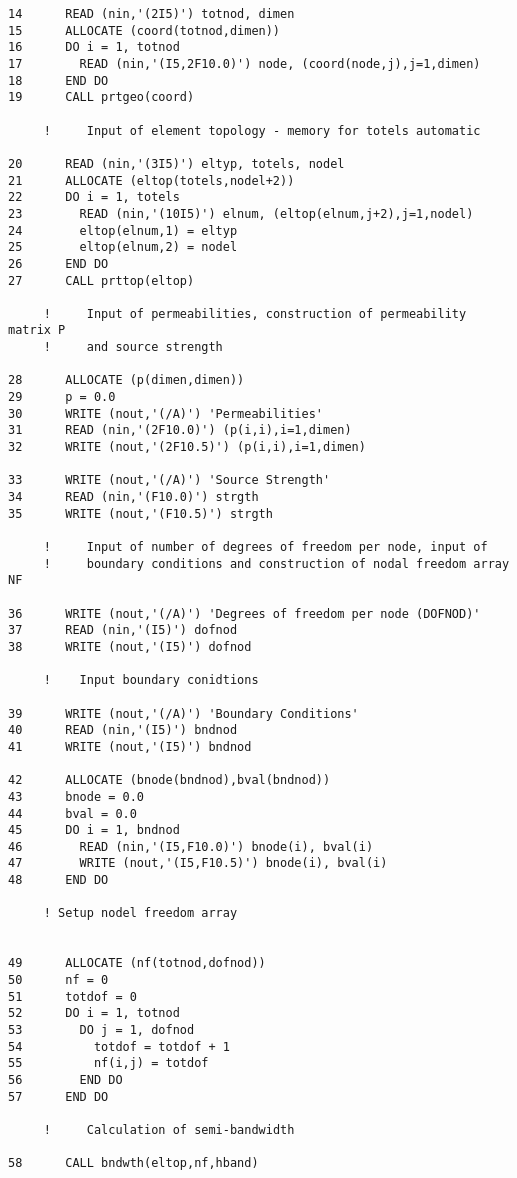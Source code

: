 \begin{verbatim}
14      READ (nin,'(2I5)') totnod, dimen
15      ALLOCATE (coord(totnod,dimen))
16      DO i = 1, totnod
17        READ (nin,'(I5,2F10.0)') node, (coord(node,j),j=1,dimen)
18      END DO
19      CALL prtgeo(coord)
     
     !     Input of element topology - memory for totels automatic
     
20      READ (nin,'(3I5)') eltyp, totels, nodel
21      ALLOCATE (eltop(totels,nodel+2))
22      DO i = 1, totels
23        READ (nin,'(10I5)') elnum, (eltop(elnum,j+2),j=1,nodel)
24        eltop(elnum,1) = eltyp
25        eltop(elnum,2) = nodel
26      END DO
27      CALL prttop(eltop)
     
     !     Input of permeabilities, construction of permeability matrix P
     !     and source strength
     
28      ALLOCATE (p(dimen,dimen))
29      p = 0.0
30      WRITE (nout,'(/A)') 'Permeabilities'
31      READ (nin,'(2F10.0)') (p(i,i),i=1,dimen)
32      WRITE (nout,'(2F10.5)') (p(i,i),i=1,dimen)
     
33      WRITE (nout,'(/A)') 'Source Strength'
34      READ (nin,'(F10.0)') strgth
35      WRITE (nout,'(F10.5)') strgth
     
     !     Input of number of degrees of freedom per node, input of
     !     boundary conditions and construction of nodal freedom array NF
     
36      WRITE (nout,'(/A)') 'Degrees of freedom per node (DOFNOD)'
37      READ (nin,'(I5)') dofnod
38      WRITE (nout,'(I5)') dofnod
     
     !    Input boundary conidtions
     
39      WRITE (nout,'(/A)') 'Boundary Conditions'
40      READ (nin,'(I5)') bndnod
41      WRITE (nout,'(I5)') bndnod
     
42      ALLOCATE (bnode(bndnod),bval(bndnod))
43      bnode = 0.0
44      bval = 0.0
45      DO i = 1, bndnod
46        READ (nin,'(I5,F10.0)') bnode(i), bval(i)
47        WRITE (nout,'(I5,F10.5)') bnode(i), bval(i)
48      END DO
     
     ! Setup nodel freedom array
     
     
49      ALLOCATE (nf(totnod,dofnod))
50      nf = 0
51      totdof = 0
52      DO i = 1, totnod
53        DO j = 1, dofnod
54          totdof = totdof + 1
55          nf(i,j) = totdof
56        END DO
57      END DO
     
     !     Calculation of semi-bandwidth
     
58      CALL bndwth(eltop,nf,hband)
     

\end{verbatim}

